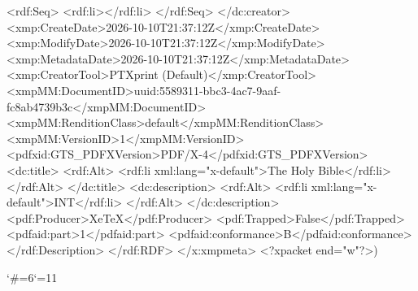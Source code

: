 {          <rdf:Seq>
            <rdf:li></rdf:li>
          </rdf:Seq>
        </dc:creator>
        <xmp:CreateDate>2026-10-10T21:37:12Z</xmp:CreateDate>
        <xmp:ModifyDate>2026-10-10T21:37:12Z</xmp:ModifyDate>
        <xmp:MetadataDate>2026-10-10T21:37:12Z</xmp:MetadataDate>
        <xmp:CreatorTool>PTXprint (Default)</xmp:CreatorTool>
        <xmpMM:DocumentID>uuid:5589311-bbc3-4ac7-9aaf-fc8ab4739b3c</xmpMM:DocumentID>
        <xmpMM:RenditionClass>default</xmpMM:RenditionClass>
        <xmpMM:VersionID>1</xmpMM:VersionID>
        <pdfxid:GTS_PDFXVersion>PDF/X-4</pdfxid:GTS_PDFXVersion>
        <dc:title>
          <rdf:Alt>
            <rdf:li xml:lang="x-default">The Holy Bible</rdf:li>
          </rdf:Alt>
        </dc:title>
        <dc:description>
          <rdf:Alt>
            <rdf:li xml:lang="x-default">INT</rdf:li>
          </rdf:Alt>
        </dc:description>
        <pdf:Producer>XeTeX</pdf:Producer>
        <pdf:Trapped>False</pdf:Trapped>
      <pdfaid:part>1</pdfaid:part>
      <pdfaid:conformance>B</pdfaid:conformance>
      </rdf:Description>
  </rdf:RDF>
</x:xmpmeta>
<?xpacket end="w"?>)}
\egroup
\catcode`\#=6\catcode`\@=11 \activ@tecustomch@rs







